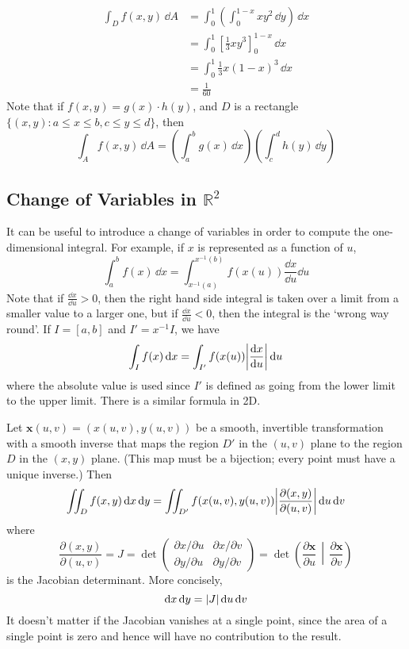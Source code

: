 \documentclass{article}
\begin{document}
\begin{align*}
    \int_D f(x, y) \,\dd A & = \int_0^1 \left( \int_0^{1-x} xy^2 \,\dd y \right) \,\dd x \\
                           & = \int_0^1 \left[ \frac{1}{3} xy^3 \right]_0^{1-x} \,\dd x  \\
                           & = \int_0^1 \frac{1}{3} x(1-x)^3 \,\dd x                     \\
                           & = \frac{1}{60}
\end{align*}
Note that if $f(x, y) = g(x) \cdot h(y)$, and $D$ is a rectangle $\{ (x, y) \colon a \leq x \leq b, c \leq y \leq d \}$, then
\[ \int_A f(x, y) \,\dd A = \left( \int_a^b g(x) \,\dd x \right)\left( \int_c^d h(y) \,\dd y \right) \]

\subsection{Change of Variables in $\mathbb R^2$}
It can be useful to introduce a change of variables in order to compute the one-dimensional integral. For example, if $x$ is represented as a function of $u$,
\[ \int_a^b f(x) \,\dd x = \int_{x^{-1}(a)}^{x^{-1}(b)} f(x(u)) \frac{\dd x}{\dd u}\dd u \]
Note that if $\frac{\dd x}{\dd u} > 0$, then the right hand side integral is taken over a limit from a smaller value to a larger one, but if $\frac{\dd x}{\dd u} < 0$, then the integral is the `wrong way round'. If $I = [a,b]$ and $I' = x^{-1} I$, we have
\[ \int_I f(x) \,\dd x = \int_{I'} f(x(u)) \abs{\frac{\dd x}{\dd u}} \,\dd u \]
where the absolute value is used since $I'$ is defined as going from the lower limit to the upper limit. There is a similar formula in 2D.
\begin{proposition}
    Let $\bm x(u, v) = (x(u, v), y(u, v))$ be a smooth, invertible transformation with a smooth inverse that maps the region $D'$ in the $(u, v)$ plane to the region $D$ in the $(x, y)$ plane. (This map must be a bijection; every point must have a unique inverse.) Then
    \[ \iint_D f(x, y) \,\dd x \,\dd y = \iint_{D'} f(x(u, v), y(u, v)) \abs{\frac{\partial (x, y)}{\partial (u, v)}}\,\dd u \,\dd v \]
    where
    \[ \frac{\partial (x, y)}{\partial (u, v)} = J = \det \begin{pmatrix}
            \partial x / \partial u & \partial x / \partial v \\
            \partial y / \partial u & \partial y / \partial v
        \end{pmatrix} = \det \left( \frac{\partial \bm x}{\partial u} \,\middle|\, \frac{\partial \bm x}{\partial v} \right) \]
    is the Jacobian determinant. More concisely,
    \[ \dd x \, \dd y = \abs{J} \, \dd u \, \dd v \]
    It doesn't matter if the Jacobian vanishes at a single point, since the area of a single point is zero and hence will have no contribution to the result.
\end{proposition}
\end{document}

